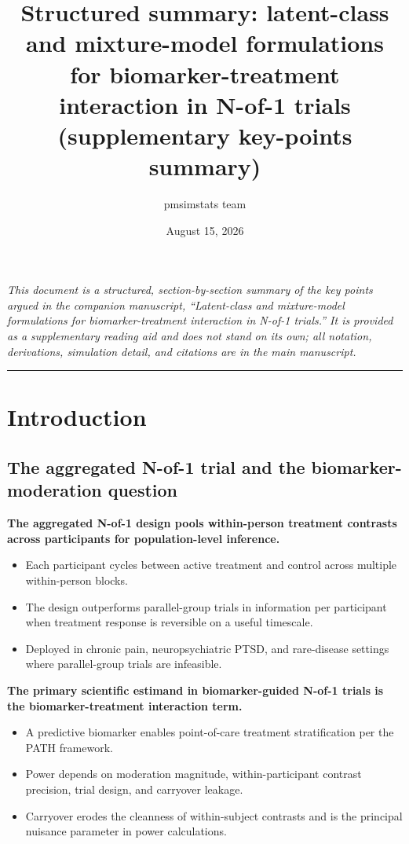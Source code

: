 \documentclass[
  11pt,
]{article}
\title{Structured summary: latent-class and mixture-model formulations for biomarker-treatment interaction in N-of-1 trials (supplementary key-points summary)}
\author{pmsimstats team}
\date{August 15, 2026}
\begin{document}
\maketitle

{
\setcounter{tocdepth}{2}
\tableofcontents
}
\emph{This document is a structured, section-by-section summary of
the key points argued in the companion manuscript, ``Latent-class
and mixture-model formulations for biomarker-treatment interaction
in N-of-1 trials.'' It is provided as a supplementary reading aid
and does not stand on its own; all notation, derivations, simulation
detail, and citations are in the main manuscript.}

\bigskip\noindent

\rule{\textwidth}{0.4pt}\bigskip

\section{Introduction}\label{introduction}

\subsection{The aggregated N-of-1 trial and the biomarker-moderation question}\label{the-aggregated-n-of-1-trial-and-the-biomarker-moderation-question}

\textbf{The aggregated N-of-1 design pools within-person treatment
contrasts across participants for population-level inference.}

\begin{itemize}\setlength{\itemsep}{2pt}\setlength{\parskip}{0pt}
\item Each participant cycles between active treatment and control
  across multiple within-person blocks.
\item The design outperforms parallel-group trials in information per
  participant when treatment response is reversible on a useful
  timescale.
\item Deployed in chronic pain, neuropsychiatric PTSD, and rare-disease
  settings where parallel-group trials are infeasible.
\end{itemize}

\textbf{The primary scientific estimand in biomarker-guided N-of-1
trials is the biomarker-treatment interaction term.}

\begin{itemize}\setlength{\itemsep}{2pt}\setlength{\parskip}{0pt}
\item A predictive biomarker enables point-of-care treatment
  stratification per the PATH framework.
\item Power depends on moderation magnitude, within-participant
  contrast precision, trial design, and carryover leakage.
\item Carryover erodes the cleanness of within-subject contrasts and
  is the principal nuisance parameter in power calculations.
\end{itemize}
\end{document}
